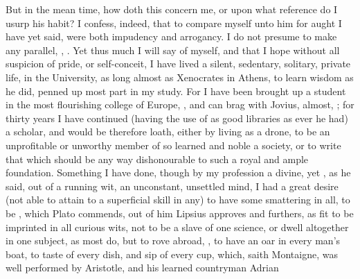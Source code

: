 {But in the mean time, how doth this concern me, or upon what reference
do I usurp his habit? I confess, indeed, that to compare myself unto
him for aught I have yet said, were both impudency and arrogancy. I do
not presume to make any parallel, , . Yet thus much I
will say of myself, and that I hope without all suspicion of pride, or
self-conceit, I have lived a silent, sedentary, solitary, private life,
 in the University, as long almost as Xenocrates in
Athens,  to learn wisdom as he did, penned up most part
in my study. For I have been brought up a student in the most
flourishing college of Europe,  , and can brag
with Jovius, almost, ; for thirty years I
have continued (having the use of as good libraries as ever he had)
a scholar, and would be therefore loath, either by living as a drone,
to be an unprofitable or unworthy member of so learned and noble a
society, or to write that which should be any way dishonourable to such
a royal and ample foundation. Something I have done, though by my
profession a divine, yet , as he said, out of
a running wit, an unconstant, unsettled mind, I had a great desire (not
able to attain to a superficial skill in any) to have some smattering
in all, to be ,  which
Plato commends, out of him Lipsius approves and furthers, as
fit to be imprinted in all curious wits, not to be a slave of one
science, or dwell altogether in one subject, as most do, but to rove
abroad, , to have an oar in every man's boat, to 
taste of every dish, and sip of every cup, which, saith Montaigne,
was well performed by Aristotle, and his learned countryman Adrian
}
